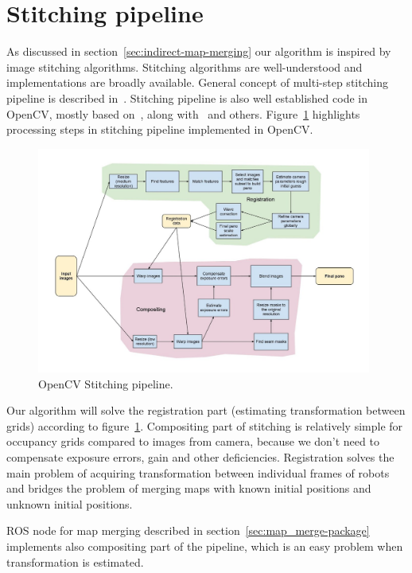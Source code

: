\section{Stitching pipeline} %
\label{sec:stitchingpipeline}

As discussed in section~\ref{sec:indirect-map-merging} our algorithm is inspired by image stitching algorithms. Stitching algorithms are well-understood and implementations are broadly available. General concept of multi-step stitching pipeline is described in~\cite{Brown2006}. Stitching pipeline is also well established code in \gls{OpenCV}, mostly based on~\cite{Brown2006}, along with~\cite{Szeliski2004} \cite{Shum1998} and others. Figure~\ref{fig:opencv} highlights processing steps in stitching pipeline implemented in \gls{OpenCV}.

\begin{figure}
	\centering
	\includegraphics[width=4.33in]{../img/StitchingPipeline.jpg}
	\caption{\gls{OpenCV} Stitching pipeline.}
	\label{fig:opencv}
\end{figure}

Our algorithm will solve the registration part (estimating transformation between grids) according to figure~\ref{fig:opencv}. Compositing part of stitching is relatively simple for occupancy grids compared to images from camera, because we don't need to compensate exposure errors, gain and other deficiencies. Registration solves the main problem of acquiring transformation between individual frames of robots and bridges the problem of merging maps with known initial positions and unknown initial positions.

\gls{ROS} node for map merging described in section~\ref{sec:map_merge-package} implements also compositing part of the pipeline, which is an easy problem when transformation is estimated.

